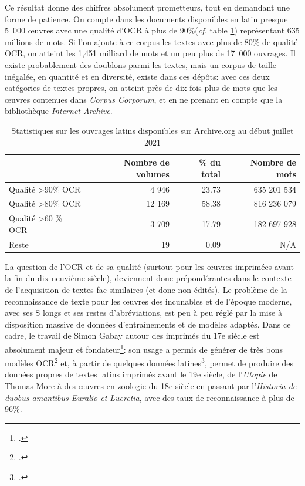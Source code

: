 Ce résultat donne des chiffres absolument prometteurs, tout en demandant une forme de patience. On compte dans les documents disponibles en latin presque 5~000 œuvres avec une qualité d'OCR à plus de 90\%(\textit{cf.} table \ref{tab:chap1:latin-OCR}) représentant 635 millions de mots. Si l'on ajoute à ce corpus les textes avec plus de 80\% de qualité OCR, on atteint les 1,451 milliard de mots et un peu plus de 17~000 ouvrages. Il existe probablement des doublons parmi les textes, mais un corpus de taille inégalée, en quantité et en diversité, existe dans ces dépôts: avec ces deux catégories de textes propres, on atteint près de dix fois plus de mots que les œuvres contenues dans \textit{Corpus Corporum}, et en ne prenant en compte que la bibliothèque \textit{Internet Archive}.

\begin{table}[ht]
\centering
\begin{tabular}{l|rrr}
\toprule
                               & Nombre de volumes & \% du total & Nombre de mots \\ \midrule
Qualité \textgreater 90\% OCR  & 4 946              & 23.73       & 635 201 534    \\
Qualité \textgreater 80\% OCR  & 12 169             & 58.38       & 816 236 079      \\
Qualité \textgreater 60 \% OCR & 3 709              & 17.79       & 182 697 928      \\
Reste                          & 19                 & 0.09        & N/A           \\ \bottomrule
\end{tabular}
\caption{Statistiques sur les ouvrages latins disponibles sur Archive.org au début juillet 2021}
\label{tab:chap1:latin-OCR}
\end{table}

La question de l'OCR et de sa qualité (surtout pour les œuvres imprimées avant la fin du dix-neuvième siècle), deviennent donc prépondérantes dans le contexte de l'acquisition de textes fac-similaires (et donc non édités). Le problème de la reconnaissance de texte pour les œuvres des incunables et de l'époque moderne, avec ses S longs et ses restes d'abréviations, est peu à peu réglé par la mise à disposition massive de données d'entraînements et de modèles adaptés. Dans ce cadre, le travail de Simon Gabay autour des imprimés du 17e siècle est absolument majeur et fondateur\footcite{simon_gabay_2020_3826894}: son usage a permis de générer de très bons modèles OCR\footcite{gabay:hal-02577236} et, à partir de quelques données latines\footcite{Clerice_CREMMA_16_18_Prints_2021}, permet de produire des données propres de textes latins imprimés avant le 19e siècle, de l'\textit{Utopie} de Thomas More à des œuvres en zoologie du 18e siècle en passant par l'\textit{Historia de duobus amantibus Euralio et Lucretia}, avec des taux de reconnaissance à plus de 96\%. 


